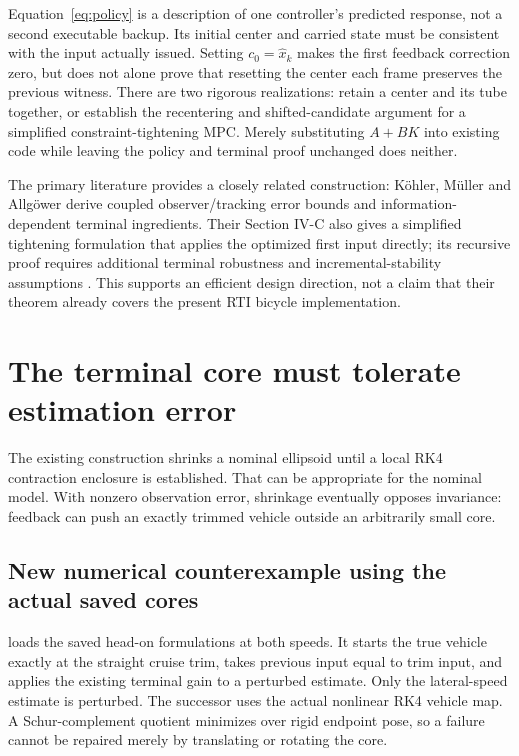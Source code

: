 \documentclass[11pt]{article}
\begin{document}
Equation~\eqref{eq:policy} is a description of one controller's predicted
response, not a second executable backup. Its initial center and carried
state must be consistent with the input actually issued. Setting
$c_0=\hat x_k$ makes the first feedback correction zero, but does not alone
prove that resetting the center each frame preserves the previous witness.
There are two rigorous realizations: retain a center and its tube together,
or establish the recentering and shifted-candidate argument for a simplified
constraint-tightening MPC. Merely substituting $A+BK$ into existing code
while leaving the policy and terminal proof unchanged does neither.

The primary literature provides a closely related construction: K\"ohler,
M\"uller and Allg\"ower derive coupled observer/tracking error bounds and
information-dependent terminal ingredients. Their Section IV-C also gives a
simplified tightening formulation that applies the optimized first input
directly; its recursive proof requires additional terminal robustness and
incremental-stability assumptions \cite{Kohler}. This supports an efficient
design direction, not a claim that their theorem already covers the present
RTI bicycle implementation.

\section{The terminal core must tolerate estimation error}
The existing construction shrinks a nominal ellipsoid until a local RK4
contraction enclosure is established. That can be appropriate for the
nominal model. With nonzero observation error, shrinkage eventually opposes
invariance: feedback can push an exactly trimmed vehicle outside an
arbitrarily small core.

\subsection{New numerical counterexample using the actual saved cores}
 loads the saved head-on
formulations at both speeds. It starts the true vehicle exactly at the
straight cruise trim, takes previous input equal to trim input, and applies
the existing terminal gain to a perturbed estimate. Only the lateral-speed
estimate is perturbed. The successor uses the actual nonlinear RK4 vehicle
map. A Schur-complement quotient minimizes over rigid endpoint pose, so a
failure cannot be repaired merely by translating or rotating the core.
\end{document}
